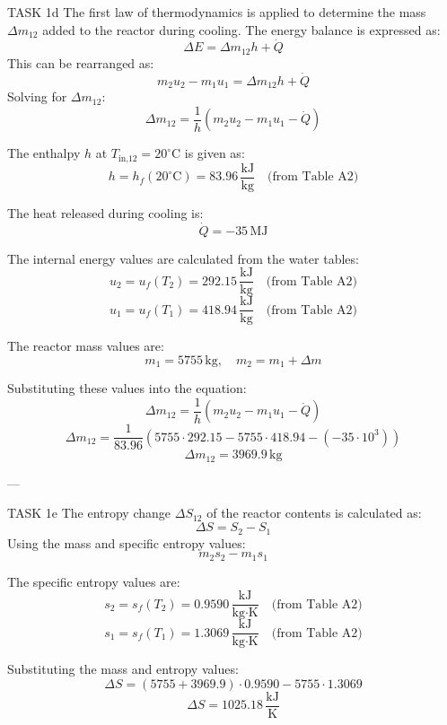 TASK 1d  
The first law of thermodynamics is applied to determine the mass \( \Delta m_{12} \) added to the reactor during cooling. The energy balance is expressed as:  
\[
\Delta E = \Delta m_{12} h + \dot{Q}
\]  
This can be rearranged as:  
\[
m_2 u_2 - m_1 u_1 = \Delta m_{12} h + \dot{Q}
\]  
Solving for \( \Delta m_{12} \):  
\[
\Delta m_{12} = \frac{1}{h} (m_2 u_2 - m_1 u_1 - \dot{Q})
\]  

The enthalpy \( h \) at \( T_{\text{in,12}} = 20^\circ\text{C} \) is given as:  
\[
h = h_f(20^\circ\text{C}) = 83.96 \, \frac{\text{kJ}}{\text{kg}} \quad \text{(from Table A2)}
\]  

The heat released during cooling is:  
\[
\dot{Q} = -35 \, \text{MJ}
\]  

The internal energy values are calculated from the water tables:  
\[
u_2 = u_f(T_2) = 292.15 \, \frac{\text{kJ}}{\text{kg}} \quad \text{(from Table A2)}
\]  
\[
u_1 = u_f(T_1) = 418.94 \, \frac{\text{kJ}}{\text{kg}} \quad \text{(from Table A2)}
\]  

The reactor mass values are:  
\[
m_1 = 5755 \, \text{kg}, \quad m_2 = m_1 + \Delta m
\]  

Substituting these values into the equation:  
\[
\Delta m_{12} = \frac{1}{h} \left( m_2 u_2 - m_1 u_1 - \dot{Q} \right)
\]  
\[
\Delta m_{12} = \frac{1}{83.96} \left( 5755 \cdot 292.15 - 5755 \cdot 418.94 - (-35 \cdot 10^3) \right)
\]  
\[
\Delta m_{12} = 3969.9 \, \text{kg}
\]  

---

TASK 1e  
The entropy change \( \Delta S_{12} \) of the reactor contents is calculated as:  
\[
\Delta S = S_2 - S_1
\]  
Using the mass and specific entropy values:  
\[
m_2 s_2 - m_1 s_1
\]  

The specific entropy values are:  
\[
s_2 = s_f(T_2) = 0.9590 \, \frac{\text{kJ}}{\text{kg·K}} \quad \text{(from Table A2)}
\]  
\[
s_1 = s_f(T_1) = 1.3069 \, \frac{\text{kJ}}{\text{kg·K}} \quad \text{(from Table A2)}
\]  

Substituting the mass and entropy values:  
\[
\Delta S = (5755 + 3969.9) \cdot 0.9590 - 5755 \cdot 1.3069
\]  
\[
\Delta S = 1025.18 \, \frac{\text{kJ}}{\text{K}}
\]  